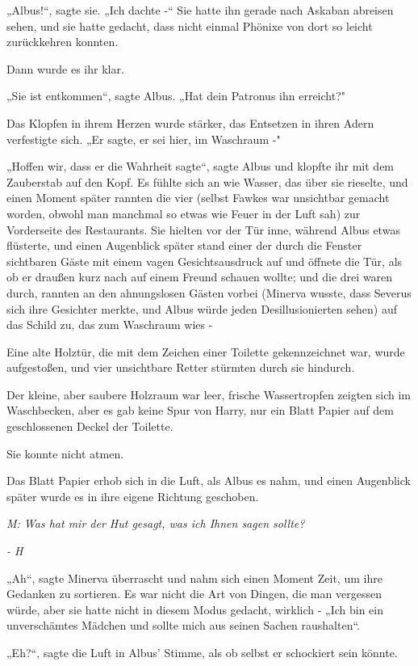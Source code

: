 {„Albus!“, sagte sie. „Ich dachte -“ Sie hatte ihn gerade nach Askaban abreisen sehen, und sie hatte gedacht, dass nicht einmal Phönixe von dort so leicht zurückkehren konnten.

Dann wurde es ihr klar.

„Sie ist entkommen“, sagte Albus. „Hat dein Patronus ihn erreicht?"

Das Klopfen in ihrem Herzen wurde stärker, das Entsetzen in ihren Adern verfestigte sich. „Er sagte, er sei hier, im Waschraum -"

„Hoffen wir, dass er die Wahrheit sagte“, sagte Albus und klopfte ihr mit dem Zauberstab auf den Kopf. Es fühlte sich an wie Wasser, das über sie rieselte, und einen Moment später rannten die vier (selbst Fawkes war unsichtbar gemacht worden, obwohl man manchmal so etwas wie Feuer in der Luft sah) zur Vorderseite des Restaurants. Sie hielten vor der Tür inne, während Albus etwas flüsterte, und einen Augenblick später stand einer der durch die Fenster sichtbaren Gäste mit einem vagen Gesichtsausdruck auf und öffnete die Tür, als ob er draußen kurz nach auf einem Freund schauen wollte; und die drei waren durch, rannten an den ahnungslosen Gästen vorbei (Minerva wusste, dass Severus sich ihre Gesichter merkte, und Albus würde jeden Desillusionierten sehen) auf das Schild zu, das zum Waschraum wies -

Eine alte Holztür, die mit dem Zeichen einer Toilette gekennzeichnet war, wurde aufgestoßen, und vier unsichtbare Retter stürmten durch sie hindurch.

Der kleine, aber saubere Holzraum war leer, frische Wassertropfen zeigten sich im Waschbecken, aber es gab keine Spur von Harry, nur ein Blatt Papier auf dem geschlossenen Deckel der Toilette.

Sie konnte nicht atmen.

Das Blatt Papier erhob sich in die Luft, als Albus es nahm, und einen Augenblick später wurde es in ihre eigene Richtung geschoben.

\emph{\emph{M: Was hat mir der Hut gesagt, was ich Ihnen sagen sollte?}}

\emph{\emph{- H}}

„Ah“, sagte Minerva überrascht und nahm sich einen Moment Zeit, um ihre Gedanken zu sortieren. Es war nicht die Art von Dingen, die man vergessen würde, aber sie hatte nicht in diesem Modus gedacht, wirklich - „Ich bin ein unverschämtes Mädchen und sollte mich aus seinen Sachen raushalten“.

„Eh?“, sagte die Luft in Albus' Stimme, als ob selbst er schockiert sein könnte.

}
